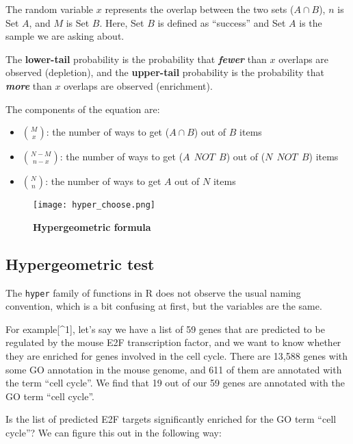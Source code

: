 \documentclass[
]{article}
\providecommand{\tightlist}{%
  \setlength{\itemsep}{0pt}\setlength{\parskip}{0pt}}
\begin{document}
The random variable \(x\) represents the overlap between the two sets
(\(A \cap B\)), \(n\) is Set \(A\), and \(M\) is Set \(B\). Here, Set
\(B\) is defined as ``success'' and Set \(A\) is the sample we are
asking about.

The \textbf{lower-tail} probability is the probability that
\textbf{\emph{fewer}} than \(x\) overlaps are observed (depletion), and
the \textbf{upper-tail} probability is the probability that
\textbf{\emph{more}} than \(x\) overlaps are observed (enrichment).

The components of the equation are:

\begin{itemize}
\tightlist
\item
  \(\binom{M}{x}\): the number of ways to get (\(A \cap B\)) out of
  \(B\) items
\item
  \(\binom{N - M}{n - x}\): the number of ways to get
  (\(A\ \ NOT\ \ B\)) out of (\(N\ \ NOT\ \ B\)) items
\item
  \(\binom{N}{n}\): the number of ways to get \(A\) out of \(N\) items
\end{itemize}

\begin{figure}
\centering
\texttt{[image: hyper\_choose.png]}
\caption{\textbf{Hypergeometric formula}}
\end{figure}

\hypertarget{hypergeometric-test}{%
\subsection{Hypergeometric test}\label{hypergeometric-test}}

The \texttt{hyper} family of functions in R does not observe the usual
naming convention, which is a bit confusing at first, but the variables
are the same.

For example{[}\^{}1{]}, let's say we have a list of 59 genes that are
predicted to be regulated by the mouse E2F transcription factor, and we
want to know whether they are enriched for genes involved in the cell
cycle. There are 13,588 genes with some GO annotation in the mouse
genome, and 611 of them are annotated with the term ``cell cycle''. We
find that 19 out of our 59 genes are annotated with the GO term ``cell
cycle''.

Is the list of predicted E2F targets significantly enriched for the GO
term ``cell cycle''? We can figure this out in the following way:
\end{document}
